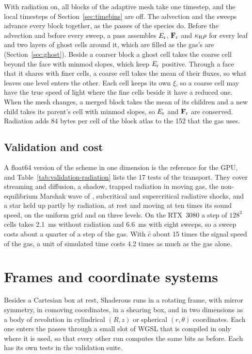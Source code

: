 \documentclass[twocolumn]{aastex701}
\begin{document}
With radiation on, all blocks of the adaptive mesh take one timestep, and the local timesteps of Section~\ref{sec:timebins} are off. The advection and the sweeps advance every block together, as the passes of the species do. Before the advection and before every sweep, a pass assembles $E_{\rm r}$, $\mathbf{F}_{\rm r}$ and $\kappa_{\rm R}\rho$ for every leaf and two layers of ghost cells around it, which are filled as the gas's are (Section~\ref{sec:ghost}). Beside a coarser block a ghost cell takes the coarse cell beyond the face with minmod slopes, which keep $E_{\rm r}$ positive. Through a face that it shares with finer cells, a coarse cell takes the mean of their fluxes, so what leaves one level enters the other. Each cell keeps its own $\xi$, so a coarse cell may have the true speed of light where the fine cells beside it have a reduced one. When the mesh changes, a merged block takes the mean of its children and a new child takes its parent's cell with minmod slopes, so $E_{\rm r}$ and $\mathbf{F}_{\rm r}$ are conserved. Radiation adds 84 bytes per cell of the block atlas to the 152 that the gas uses.

\subsection{Validation and cost}
\label{sec:radtests}

A float64 version of the scheme in one dimension is the reference for the GPU, and Table~\ref{tab:validation-radiation} lists the 17 tests of the transport. They cover streaming and diffusion, a shadow, trapped radiation in moving gas, the non-equilibrium Marshak wave of \citet{SuOlson1996}, subcritical and supercritical radiative shocks, and a star held up partly by radiation, at rest and moving at ten times its sound speed, on the uniform grid and on three levels. On the RTX~3080 a step of $128^3$ cells takes 2.1~ms without radiation and 6.6~ms with eight sweeps, so a sweep costs about a quarter of a step of the gas. With $\hat{c}$ about 15 times the signal speed of the gas, a unit of simulated time costs 4.2 times as much as the gas alone.

\section{Frames and coordinate systems}
\label{sec:coordinates}

Besides a Cartesian box at rest, Shaderous runs in a rotating frame, with mirror symmetry, in comoving coordinates, in a shearing box, and in two dimensions as a body of revolution in cylindrical $(R, z)$ or spherical $(r, \theta)$ coordinates. Each one enters the passes through a small slot of WGSL that is compiled in only where it is used, so that every other run computes the same bits as before. Each has its own tests in the validation suite.
\end{document}
